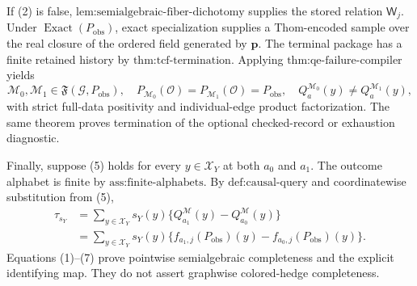 If (2) is false, \(\text{lem:semialgebraic-fiber-dichotomy}\) supplies the stored relation \(\mathsf W_j\). Under \(\operatorname{Exact}(P_{\mathrm{obs}})\), exact specialization supplies a Thom-encoded sample over the real closure of the ordered field generated by \(\mathbf p\). The terminal package has a finite retained history by \(\text{thm:tcf-termination}\). Applying \(\text{thm:qe-failure-compiler}\) yields
\[
\mathcal M_0,\mathcal M_1\in\mathfrak F(\mathcal G,P_{\mathrm{obs}}),
\quad
P_{\mathcal M_0}(\mathcal O)=P_{\mathcal M_1}(\mathcal O)=P_{\mathrm{obs}},
\quad
Q_a^{\mathcal M_0}(y)\neq Q_a^{\mathcal M_1}(y),
\tag{6}
\]
with strict full-data positivity and individual-edge product factorization. The same theorem proves termination of the optional checked-record or exhaustion diagnostic.

Finally, suppose (5) holds for every \(y\in\mathcal X_Y\) at both \(a_0\) and \(a_1\). The outcome alphabet is finite by \(\text{ass:finite-alphabets}\). By \(\text{def:causal-query}\) and coordinatewise substitution from (5),
\[
\begin{aligned}
\tau_{s_Y}
&=\sum_{y\in\mathcal X_Y}s_Y(y)
\{Q_{a_1}^{\mathcal M}(y)-Q_{a_0}^{\mathcal M}(y)\}\\
&=\sum_{y\in\mathcal X_Y}s_Y(y)
\{f_{a_1,j}(P_{\mathrm{obs}})(y)-f_{a_0,j}(P_{\mathrm{obs}})(y)\}.
\end{aligned}
\tag{7}
\]
Equations (1)--(7) prove pointwise semialgebraic completeness and the explicit identifying map. They do not assert graphwise colored-hedge completeness.